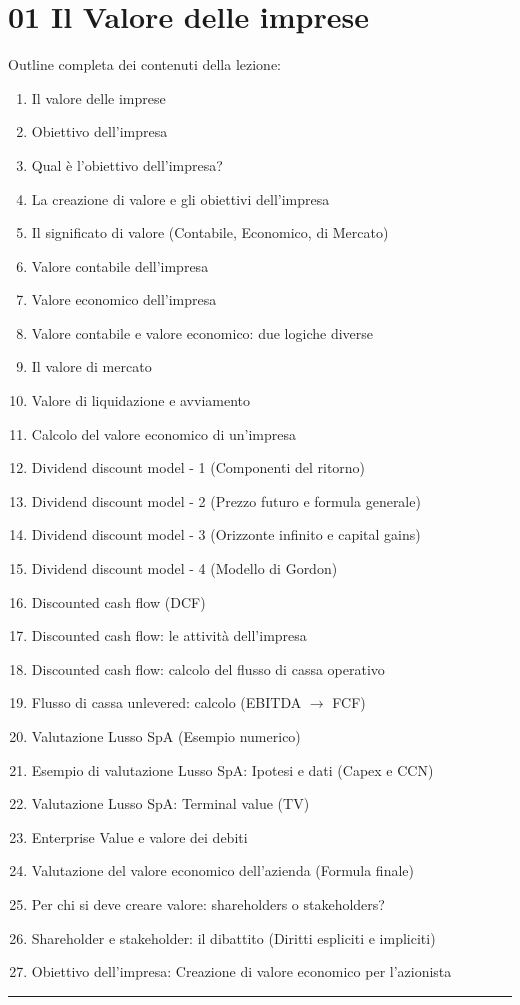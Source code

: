 \documentclass[a4paper,10pt]{article}
\begin{document}
\section*{01 Il Valore delle imprese}
Outline completa dei contenuti della lezione:
{\small
\begin{enumerate}
    \item Il valore delle imprese
    \item Obiettivo dell’impresa
    \item Qual è l’obiettivo dell’impresa?
    \item La creazione di valore e gli obiettivi dell’impresa
    \item Il significato di valore (Contabile, Economico, di Mercato)
    \item Valore contabile dell’impresa
    \item Valore economico dell’impresa
    \item Valore contabile e valore economico: due logiche diverse
    \item Il valore di mercato
    \item Valore di liquidazione e avviamento
    \item Calcolo del valore economico di un’impresa
    \item Dividend discount model - 1 (Componenti del ritorno)
    \item Dividend discount model - 2 (Prezzo futuro e formula generale)
    \item Dividend discount model - 3 (Orizzonte infinito e capital gains)
    \item Dividend discount model - 4 (Modello di Gordon)
    \item Discounted cash flow (DCF)
    \item Discounted cash flow: le attività dell’impresa
    \item Discounted cash flow: calcolo del flusso di cassa operativo
    \item Flusso di cassa unlevered: calcolo (EBITDA $\rightarrow$ FCF)
    \item Valutazione Lusso SpA (Esempio numerico)
    \item Esempio di valutazione Lusso SpA: Ipotesi e dati (Capex e CCN)
    \item Valutazione Lusso SpA: Terminal value (TV)
    \item Enterprise Value e valore dei debiti
    \item Valutazione del valore economico dell’azienda (Formula finale)
    \item Per chi si deve creare valore: shareholders o stakeholders?
    \item Shareholder e stakeholder: il dibattito (Diritti espliciti e impliciti)
    \item Obiettivo dell’impresa: Creazione di valore economico per l’azionista
\end{enumerate}
}
\hrule
\vspace{0.5cm}
\end{document}
